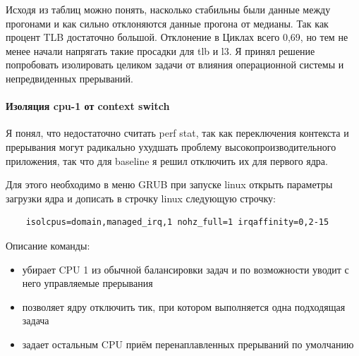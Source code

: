 \documentclass[a4paper,12pt]{article}
\begin{document}
Исходя из таблиц можно понять, насколько стабильны были данные между прогонами и
как сильно отклоняются данные прогона от медианы. Так как процент TLB достаточно
большой. Отклонение в Циклах всего 0,69, но тем не менее начали напрягать такие
просадки для tlb и l3. Я принял решение попробовать изолировать целиком задачи
от влияния операционной системы и непредвиденных прерываний.

\paragraph{Изоляция cpu-1 от context switch}

Я понял, что недостаточно считать perf stat, так как переключения контекста и
прерывания могут радикально ухудшать проблему высокопроизводительного
приложения, так что для baseline я решил отключить их для первого ядра.

Для этого необходимо в меню GRUB при запуске linux открыть параметры загрузки
ядра и дописать в строчку linux следующую строчку:
\begin{verbatim}
    isolcpus=domain,managed_irq,1 nohz_full=1 irqaffinity=0,2-15
\end{verbatim}

Описание команды:
\begin{itemize}
    \item убирает CPU 1 из обычной балансировки задач и по возможности
уводит с него управляемые прерывания
    \item позволяет ядру отключить тик, при котором выполняется одна подходящая задача
    \item задает остальным CPU приём перенаплавленных прерываний по умолчанию
\end{itemize}
\end{document}
